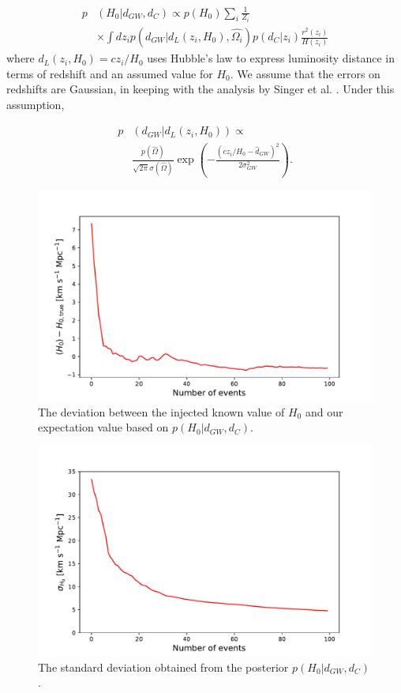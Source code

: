 \begin{align}
     p&(H_0|d_{GW}, d_C)\propto p(H_0) \sum_i \frac{1}{Z_i} \nonumber\\
     &\times \int dz_i p\left(d_{GW}|d_L(z_i, H_0), \hat{\Omega_{i}}\right)p(d_C|z_i)\frac{r^2 (z_i)}{H(z_i)}
    \label{eq: finaleq}
\end{align}
where $d_L(z_i, H_0) = cz_i / H_0$ uses Hubble's law to express luminosity distance in terms of redshift and an assumed value for $H_0$. We assume that the errors on redshifts are Gaussian, in keeping with the analysis by Singer et al. \cite{Singer_2016}. Under this assumption,

\begin{align}
    p&\left(d_{GW}|d_L(z_i, H_0)\right)\propto \nonumber\\
    &\frac{p(\hat{\Omega})}{\sqrt{2\pi}\sigma(\hat{\Omega})} \exp\left(-\frac{(cz_i/H_0 - \hat{d}_{GW})^2}{2\sigma_{GW}^2}\right).
    \label{eq:GW_like}
\end{align}

\begin{figure}
    \centering
    \includegraphics[width=\columnwidth]{figures/diff.pdf}
    \caption{The deviation between the injected known value of $H_0$ and our expectation value based on $p(H_0 | d_{GW}, d_C)$.}
    \label{fig:mean_diff}
\end{figure}

\begin{figure}
    \centering
    \includegraphics[width=\columnwidth]{figures/std.pdf}
    \caption{The standard deviation obtained from the posterior $p(H_0 | d_{GW}, d_C)$.}
    \label{fig:std}
\end{figure}

